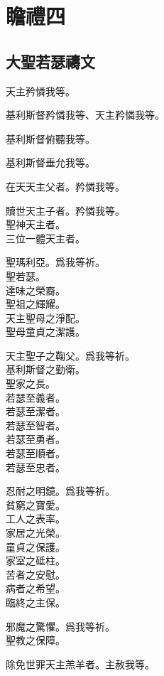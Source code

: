 \chapter[瞻禮四]{瞻禮四}
\section{大聖若瑟禱文}
\versicle 天主矜憐我等。

\Response 基利斯督矜憐我等、天主矜憐我等。

\versicle 基利斯督俯聽我等。

\Response 基利斯督垂允我等。

\versicle 在天天主父者。\hfill \response 矜憐我等。

\versicle 贖世天主子者。\hfill \response 矜憐我等。\\
聖神天主者。\\
三位一體天主者。

\versicle 聖瑪利亞。\hfill \response 爲我等祈。\\
聖若瑟。\\
達味之榮裔。\\
聖祖之輝耀。\\
天主聖母之淨配。\\
聖母童貞之潔護。

\versicle 天主聖子之鞠父。\hfill \response 爲我等祈。\\
基利斯督之勤衛。\\
聖家之長。\\
若瑟至義者。\\
若瑟至潔者。\\
若瑟至智者。\\
若瑟至勇者。\\
若瑟至順者。\\
若瑟至忠者。

\versicle 忍耐之明鏡。\hfill \response 爲我等祈。\\
貧窮之寶愛。\\
工人之表率。\\
家居之光榮。\\
童貞之保護。\\
家室之砥柱。\\
苦者之安慰。\\
病者之希望。\\
臨終之主保。

\versicle 邪魔之驚懼。\hfill \response 爲我等祈。\\
聖教之保障。

\versicle 除免世罪天主羔羊者。\hfill \response 主赦我等。

